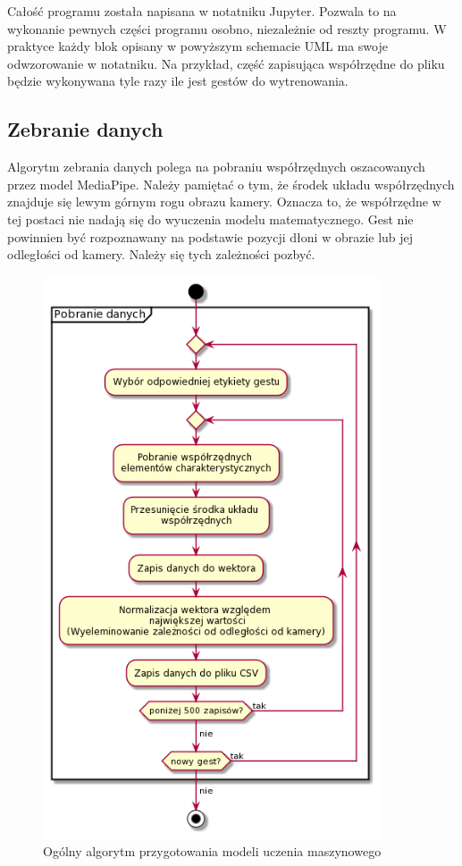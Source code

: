     \quad Całość programu została napisana w notatniku Jupyter. Pozwala to na wykonanie pewnych części programu osobno, niezależnie od reszty programu. W praktyce każdy blok opisany w powyższym schemacie UML ma swoje odwzorowanie w notatniku. Na przykład, część zapisująca współrzędne do pliku będzie wykonywana tyle razy ile jest gestów do wytrenowania. 

    \subsection{Zebranie danych}
    \quad Algorytm zebrania danych polega na pobraniu współrzędnych oszacowanych przez model MediaPipe. Należy pamiętać o tym, że środek układu współrzędnych znajduje się lewym górnym rogu obrazu kamery. Oznacza to, że współrzędne w tej postaci nie nadają się do wyuczenia modelu matematycznego. Gest nie powinnien być rozpoznawany na podstawie pozycji dłoni w obrazie lub jej odległości od kamery. Należy się tych zależności pozbyć. 
    
    \begin{figure}[H]
        \begin{center}
            \includegraphics[width=10cm]{../images/get_data.png}
            \caption{Ogólny algorytm przygotowania modeli uczenia maszynowego}
        \end{center}
    \end{figure}
    
